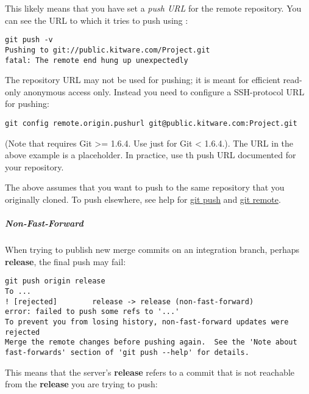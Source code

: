 This likely means that you have set a \textit{push URL} for the remote
repository. You can see the URL to which it tries to push using :

\begin{verbatim}
git push -v
Pushing to git://public.kitware.com/Project.git
fatal: The remote end hung up unexpectedly
\end{verbatim}

The  repository URL may not be used for pushing; it is meant for
efficient read-only anonymous access only. Instead you need to configure a
SSH-protocol URL for pushing:

\begin{verbatim}
git config remote.origin.pushurl git@public.kitware.com:Project.git
\end{verbatim}

(Note that  requires Git >= 1.6.4. Use just  for Git <
1.6.4.). The URL in the above example is a placeholder. In practice, use th
push URL documented for your repository.

The above assumes that you want to push to the same repository that you
originally cloned. To push elsewhere, see help for
\href{https://git-scm.com/docs/git-push}{git push} and
\href{https://git-scm.com/docs/git-remote}{git remote}.


\subparagraph{Non-Fast-Forward}
\label{subpar:NonFastForward}

When trying to publish new merge commits on an integration branch, perhaps
\textbf{release}, the final push may fail:

\begin{verbatim}
git push origin release
To ...
! [rejected]        release -> release (non-fast-forward)
error: failed to push some refs to '...'
To prevent you from losing history, non-fast-forward updates were rejected
Merge the remote changes before pushing again.  See the 'Note about
fast-forwards' section of 'git push --help' for details.
\end{verbatim}

This means that the server's \textbf{release} refers to a commit that is not
reachable from the \textbf{release} you are trying to push:

